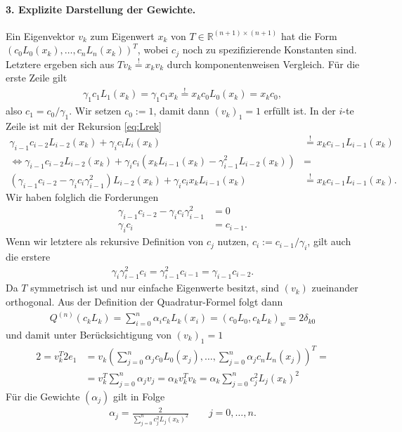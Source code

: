 \documentclass[french, 12pt, a4paper, onesided]{scrartcl}
\theoremstyle{plain}
\theoremstyle{definition}
\theoremstyle{remark}
\newcommand{\R}{\mathbb{R}}
\begin{document}
\paragraph{3. Explizite Darstellung der Gewichte.} Ein Eigenvektor $ v_k $ zum Eigenwert $ x_k $ von $ T \in \R^{(n+1)\times(n+1)} $ hat die Form $ (c_0L_0(x_k),\ldots,c_nL_n(x_k))^T $, wobei $ c_j $ noch zu spezifizierende Konstanten sind. Letztere ergeben sich aus $ Tv_k\stackrel{!}{=}x_kv_k $ durch komponentenweisen Vergleich. Für die erste Zeile gilt
\begin{align*}
	\gamma_1 c_1 L_1(x_k) = \gamma_1c_1 x_k\stackrel{!}{=}x_k c_0 L_0(x_k)=x_kc_0,
\end{align*}
also $ c_1=c_0/\gamma_1 $. Wir setzen $ c_0:=1 $, damit dann $ (v_k)_1=1 $ erfüllt ist. In der $ i $-te Zeile ist mit der Rekursion \eqref{eq:Lrek}
\begin{align*}
	\gamma_{i-1}c_{i-2}L_{i-2}(x_k)+\gamma_ic_iL_i(x_k) &\stackrel{!}{=} x_kc_{i-1}L_{i-1}(x_k) \\
	\iff \gamma_{i-1}c_{i-2}L_{i-2}(x_k)+\gamma_ic_i\left( x_kL_{i-1}(x_k)-\gamma_{i-1}^2L_{i-2}(x_k) \right) &= \\ 
	\left( \gamma_{i-1}c_{i-2}-\gamma_ic_i \gamma_{i-1}^2\right) L_{i-2}(x_k)+\gamma_ic_ix_kL_{i-1}(x_k) &\stackrel{!}{=} x_kc_{i-1}L_{i-1}(x_k).
\end{align*}
Wir haben folglich die Forderungen
\begin{align*}
	\gamma_{i-1}c_{i-2}-\gamma_ic_i \gamma_{i-1}^2 & = 0 \\
	\gamma_ic_i &= c_{i-1}.
\end{align*}
Wenn wir letztere als rekursive Definition von $ c_j $ nutzen, $ c_i:=c_{i-1}/\gamma_i $, gilt auch die erstere
\begin{align*}
	\gamma_i\gamma_{i-1}^2c_i =\gamma_{i-1}^2c_{i-1}=\gamma_{i-1}c_{i-2}.
\end{align*}
Da $ T $ symmetrisch ist und nur einfache Eigenwerte besitzt, sind $ (v_k) $ zueinander orthogonal. Aus der Definition der Quadratur-Formel folgt dann
\begin{align*}
	Q^{(n)}(c_kL_k)=\sum_{i=0}^{n}\alpha_ic_kL_k(x_i)=(c_0L_0,c_kL_k)_w=2\delta_{k0}
\end{align*}
und damit unter Berücksichtigung von $ (v_k)_1=1 $
\begin{align*}
	2=v_k^T2e_1 &= v_k\left(\sum_{j=0}^{n}\alpha_jc_0L_0(x_j),\ldots,\sum_{j=0}^{n}\alpha_jc_nL_n(x_j) \right) ^T = \\
	&= v_k^T\sum_{j=0}^{n}\alpha_jv_j=\alpha_kv_k^Tv_k=\alpha_k\sum_{j=0}^{n}c_j^2L_j(x_k)^2
\end{align*}
Für die Gewichte $ (\alpha_j) $ gilt in Folge
\begin{align}
	\alpha_j=\frac{2}{\sum_{j=0}^{n}c_j^2 L_j(x_k)^2} \qquad j=0,\ldots,n.
\end{align}
\end{document}
